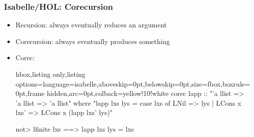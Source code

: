 \documentclass[aspectratio=169,10pt]{beamer}
\begin{document}
\begin{frame}[fragile]
  \frametitle{Isabelle/HOL: Corecursion}
  \begin{itemize}
    \item Recursion: always eventually reduces an argument
    \item Corecursion: always eventually produces something
          \pause
    \item Corec:
          \vspace*{-1ex}
          \begin{tcblisting}{hbox,listing only,listing options={language=isabelle,aboveskip=0pt,belowskip=0pt},size=fbox,boxrule=0pt,frame hidden,arc=0pt,colback=yellow!10!white}
corec lapp :: "'a llist => 'a llist => 'a llist" where
"lapp lxs lys = case lxs of LNil => lys | LCons x lxs' => LCons x (lapp lxs' lys)"

\<not> lfinite lxs ==> lapp lxs lys = lxs
          \end{tcblisting}
          \vspace*{-1ex}
  \end{itemize}
\end{frame}
\end{document}
